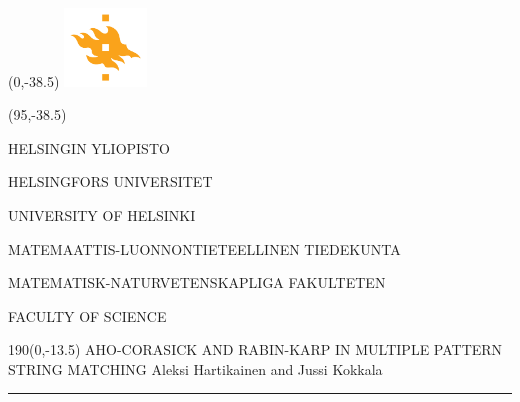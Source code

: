 \documentclass[a4paper]{article} %
\begin{document}
\pagestyle{empty} %




\begin{textblock}{95}(0,-38.5)
\includegraphics[width=22mm]{flame}
\end{textblock}	

\begin{textblock}{95}(95,-38.5)
{\fontsize{8}{7}\selectfont\sffamily\color{unigray}
\hfill HELSINGIN YLIOPISTO

\hfill HELSINGFORS UNIVERSITET

\hfill UNIVERSITY OF HELSINKI

\color{sciorange}\hfill MATEMAATTIS-LUONNONTIETEELLINEN TIEDEKUNTA

\hfill MATEMATISK-NATURVETENSKAPLIGA FAKULTETEN

\hfill FACULTY OF SCIENCE %


}
\end{textblock}


\begin{textblock}{190}(0,-13.5)
{\sffamily\LARGE{{\color{sciorange}AHO-CORASICK \color{unigray}AND RABIN-KARP IN MULTIPLE PATTERN\\ STRING MATCHING}}}
\small\hfill Aleksi Hartikainen and Jussi Kokkala\\ %
\rule[2mm]{190mm}{0.3pt} %
\end{textblock}
\end{document}
